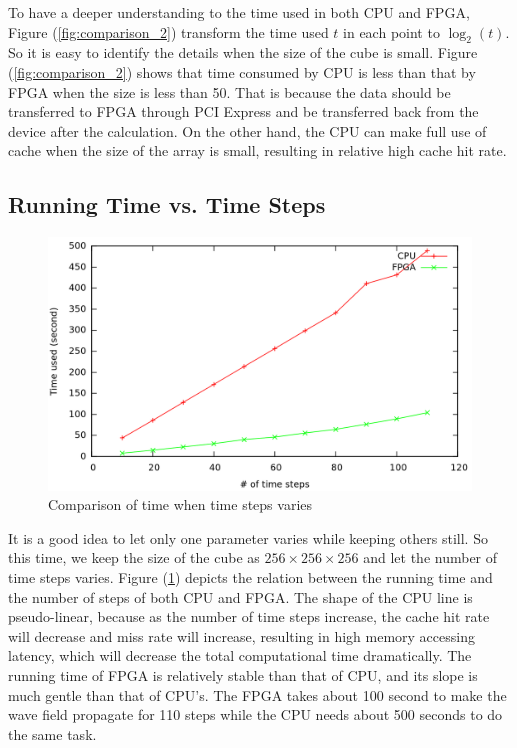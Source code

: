To have a deeper understanding to the time used in both CPU and FPGA,
Figure (\ref{fig:comparison_2}) transform the time used \( t \) in each
point to \(\log_2\left( t \right) \). So it is easy to identify the details
when the size of the cube is small. Figure (\ref{fig:comparison_2}) shows
that time consumed by CPU is less than that by FPGA when the size is less
than 50. That is because the data should be transferred to FPGA through PCI
Express and be transferred back from the device after the calculation.
On the other hand, the CPU can make full use of cache when the size of the
array is small, resulting in relative high cache hit rate.


\subsection{Running Time vs.  Time Steps} %

\begin{figure}[h]
  \centering
  \includegraphics[scale=0.32]{img/size256t10to110.png}
  \caption{Comparison of time when time steps varies}
  \label{fig:comparison_3}
\end{figure}

It is a good idea to let only one parameter varies while keeping others
still. So this time, we keep the size of the cube as \( 256 \times 256
\times 256 \) and let the number of time steps varies. Figure
(\ref{fig:comparison_3}) depicts the relation between the running time and
the number of steps of both CPU and FPGA. The shape of the CPU line is
pseudo-linear, because as the number of time steps increase, the cache hit
rate will decrease and miss rate will increase, resulting in high memory
accessing latency, which will decrease the total computational time
dramatically. The running time of FPGA is relatively stable than that of
CPU, and its slope is much gentle than that of CPU's. The FPGA takes about
100 second to make the wave field propagate for 110 steps while the CPU
needs about 500 seconds to do the same task.

